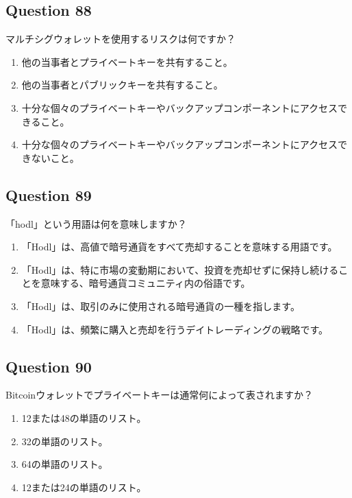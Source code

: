 \documentclass[12pt,a4paper]{article}
\begin{document}
\subsection*{Question 88}
マルチシグウォレットを使用するリスクは何ですか？

\begin{enumerate}[label=\Alph*., leftmargin=*]
\item 他の当事者とプライベートキーを共有すること。
\item 他の当事者とパブリックキーを共有すること。
\item 十分な個々のプライベートキーやバックアップコンポーネントにアクセスできること。
\item 十分な個々のプライベートキーやバックアップコンポーネントにアクセスできないこと。
\end{enumerate}

\bigskip


\subsection*{Question 89}
「hodl」という用語は何を意味しますか？

\begin{enumerate}[label=\Alph*., leftmargin=*]
\item 「Hodl」は、高値で暗号通貨をすべて売却することを意味する用語です。
\item 「Hodl」は、特に市場の変動期において、投資を売却せずに保持し続けることを意味する、暗号通貨コミュニティ内の俗語です。
\item 「Hodl」は、取引のみに使用される暗号通貨の一種を指します。
\item 「Hodl」は、頻繁に購入と売却を行うデイトレーディングの戦略です。
\end{enumerate}

\bigskip


\subsection*{Question 90}
Bitcoinウォレットでプライベートキーは通常何によって表されますか？

\begin{enumerate}[label=\Alph*., leftmargin=*]
\item 12または48の単語のリスト。
\item 32の単語のリスト。
\item 64の単語のリスト。
\item 12または24の単語のリスト。
\end{enumerate}
\end{document}

